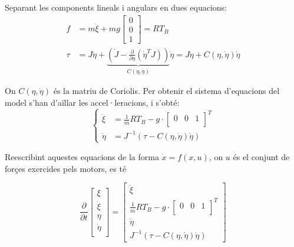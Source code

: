 \documentclass[twoside]{article}
\begin{document}
Separant les components lineals i angulars en dues equacions:
\begin{align}
f & = m \ddot{\xi} + mg \left[ \begin{array}{c}
0 \\
0 \\
1
\end{array} \right] =RT_B\\
\tau & =J \ddot{\eta} +  \underbrace{\left( \dot{J} - \frac{\partial}{\partial \dot{\eta}}(\dot{\eta}^{T}J)\right)}_{C(\eta,\dot{\eta})} \dot{\eta} =J \ddot{\eta} +  C(\eta,\dot{\eta})\dot{\eta} 
\end{align}

On $C(\eta,\dot{\eta})$ és la matriu de Coriolis. 
Per obtenir el sistema d'equacions del model s'han d'aïllar les accel·leracions, i s'obté:
\begin{equation}
\begin{cases}
\ddot{\xi} & =\frac{1}{m}RT_{B} - g \cdot \left[ \begin{array}{ccc}
0 & 0 & 1\\
\end{array} \right]^{T} \\
\ddot{\eta} & =J^{-1} \left( \tau - C(\eta,\dot{\eta})\dot{\eta}  \right)
\end{cases}
\label{eq:system}
\end{equation}

Reescribint aquestes equacions de la forma $\dot{x}=f(x,u)$, on $u$ és el conjunt de forçes exercides pels motors, es té 

\begin{equation}
\frac{\partial}{\partial t}\left[ \begin{array}{l}
\xi \\
\dot{\xi} \\
\eta \\
\dot{\eta} \\
\end{array} \right] =\left[ \begin{array}{l}
\dot{\xi} \\
\frac{1}{m}RT_{B} - g \cdot \left[ \begin{array}{ccc}
0 & 0 & 1 \\
\end{array} \right]^{T} \\
\dot{\eta} \\
J^{-1} \left( \tau - C(\eta,\dot{\eta})\dot{\eta} \right)
\end{array} \right]
\end{equation}
\end{document}
